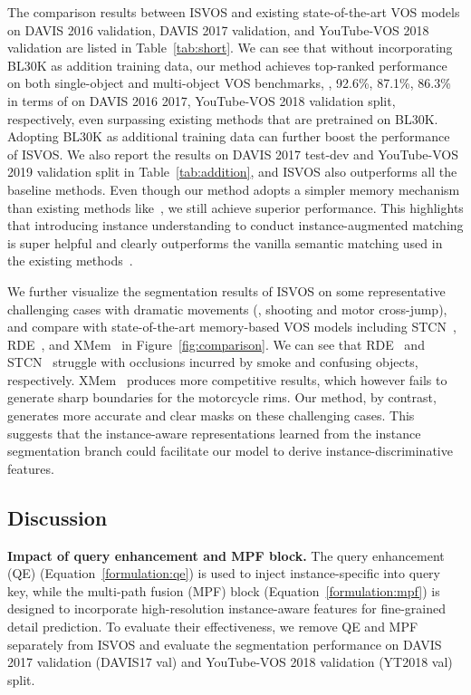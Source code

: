 \documentclass[10pt,twocolumn,letterpaper]{article}
\newcommand{\system}{ISVOS\xspace}
\begin{document}
The comparison results between \system and existing state-of-the-art VOS models on DAVIS 2016 validation, DAVIS 2017 validation, and YouTube-VOS 2018 validation are listed in Table~\ref{tab:short}. We can see that without incorporating BL30K as addition training data, our method achieves top-ranked performance on both single-object and multi-object VOS benchmarks, \ie, 92.6\%, 87.1\%, 86.3\% in terms of  on DAVIS 2016  2017, YouTube-VOS 2018 validation split, respectively, even surpassing existing methods that are pretrained on BL30K. Adopting BL30K as additional training data can further 
boost the performance of \system. We also report the results on DAVIS 2017 test-dev and YouTube-VOS 2019 validation split in Table~\ref{tab:addition}, and \system also outperforms all the baseline methods. Even though our method adopts a simpler memory mechanism than existing methods like~\cite{seong2021hierarchical,xu2022reliable,cheng2022xmem}, we still achieve superior performance. This highlights that introducing instance understanding to conduct instance-augmented matching is super helpful and clearly outperforms the vanilla semantic matching used in the existing methods~\cite{oh2019video,cheng2021stcn,cheng2022xmem}. 

We further visualize the segmentation results of \system on some representative challenging cases with dramatic movements (\eg, shooting and motor cross-jump), and compare with state-of-the-art memory-based VOS models including STCN~\cite{cheng2021stcn}, RDE~\cite{li2022recurrent}, and XMem~\cite{cheng2022xmem} in Figure~\ref{fig:comparison}. We can see that RDE~\cite{li2022recurrent} and STCN~\cite{cheng2021stcn} struggle with occlusions incurred by smoke and confusing objects, respectively. XMem~\cite{cheng2022xmem} produces more competitive results, which however fails to generate sharp boundaries for the motorcycle rims. Our method, by contrast, generates more accurate and clear masks on these challenging cases. This suggests that the instance-aware representations learned from the instance segmentation branch could facilitate our model to derive instance-discriminative features.

\subsection{Discussion}
\noindent \textbf{Impact of query enhancement and MPF block.} The query enhancement (QE) (Equation~\ref{formulation:qe}) is used to inject instance-specific into query key, while the multi-path fusion (MPF) block (Equation~\ref{formulation:mpf}) is designed to incorporate high-resolution instance-aware features for fine-grained detail prediction. To evaluate their effectiveness, we remove QE and MPF separately from \system and evaluate the segmentation performance on DAVIS 2017 validation (DAVIS17 val) and YouTube-VOS 2018 validation (YT2018 val) split.
\end{document}
